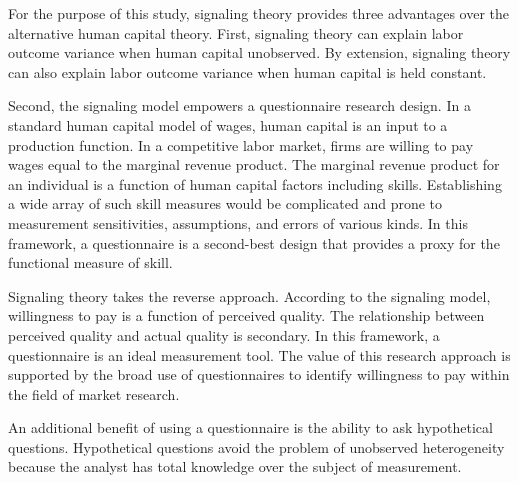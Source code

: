 \documentclass[review]{elsarticle}
\begin{document}
For the purpose of this study, signaling theory provides three advantages over the alternative human capital theory.
First, signaling theory can explain labor outcome variance when human capital unobserved\cite{weiss1995human}.
By extension, signaling theory can also explain labor outcome variance when human capital is held constant.

Second, the signaling model empowers a questionnaire research design.
In a standard human capital model of wages, human capital is an input to a production function\cite{hellerstein2007production}.
In a competitive labor market, firms are willing to pay wages equal to the marginal revenue product.
The marginal revenue product for an individual is a function of human capital factors including skills.
Establishing a wide array of such skill measures would be complicated and prone to measurement sensitivities, assumptions, and errors of various kinds.
In this framework, a questionnaire is a second-best design that provides a proxy for the functional measure of skill.

Signaling theory takes the reverse approach.
According to the signaling model, willingness to pay is a function of perceived quality.
The relationship between perceived quality and actual quality is secondary.
In this framework, a questionnaire is an ideal measurement tool.
The value of this research approach is supported by the broad use of questionnaires
to identify willingness to pay within the field of market research\cite{ingenbleek2013best}.

An additional benefit of using a questionnaire is the ability to ask hypothetical questions.
Hypothetical questions avoid the problem of unobserved heterogeneity
because the analyst has total knowledge over the subject of measurement.
\end{document}
